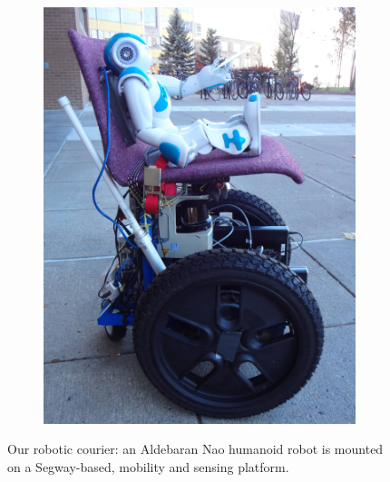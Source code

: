 \begin{figure}[t]
\begin{subfigure}[b]{0.493\columnwidth}
	\includegraphics[width=\columnwidth]{img/mailbot_side.jpg}
	\end{subfigure}	
	\caption{Our robotic courier: an Aldebaran Nao humanoid robot is mounted on a Segway-based, mobility and sensing platform.}
	\label{Fig:mailbot}
	\vspace{-5 pt}
\end{figure}

